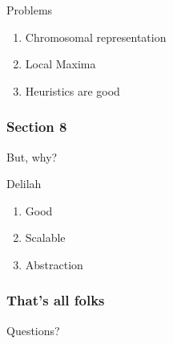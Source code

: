 \documentclass[24pt]{beamer}
\begin{document}
    \begin{frame}{Problems}
        \begin{enumerate}
            \item Chromosomal representation
            \item Local Maxima
            \item Heuristics are good
        \end{enumerate}
    \end{frame}

    \begin{centering}
        \begin{frame}[c]{}
            \frametitle{Section 8}
            But, why?
        \end{frame}
    \end{centering}

    \begin{frame}{Delilah}
        \begin{enumerate}
            \item Good
            \pause
            \item Scalable
            \pause
            \item Abstraction
        \end{enumerate}
    \end{frame}

    \begin{centering}
        \begin{frame}[c]{}
            \frametitle{That's all folks}
            Questions?
        \end{frame}
    \end{centering}
\end{document}
